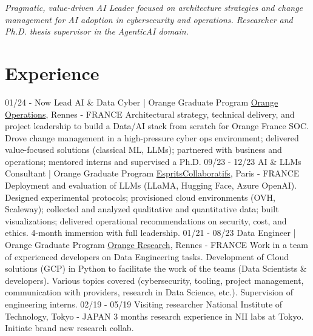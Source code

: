 \documentclass[]{friggeri-cv}
\begin{document}
\emph{Pragmatic, value-driven AI Leader focused on architecture strategies and change management for AI adoption in cybersecurity and operations. Researcher and Ph.D. thesis supervisor in the AgenticAI domain.}
\vspace{-0.5em}
\section{Experience}
\vspace{-0.5em}
\begin{entrylist}
  \entry
  {01/24 - Now}
  {Lead AI \& Data Cyber | Orange Graduate Program}
  {\href{http://www.orange.com/en/home}{Orange Operations}, Rennes - FRANCE}
  {Architectural strategy, technical delivery, and project leadership to build a Data/AI stack from scratch for Orange France SOC. Drove change management in a high-pressure cyber ops environment; delivered value-focused solutions (classical ML, LLMs); partnered with business and operations; mentored interns and supervised a Ph.D.}
  \entry
  {09/23 - 12/23}
  {AI \& LLMs Consultant | Orange Graduate Program}
  {\href{https://www.curebot.fr/}{EspritsCollaboratifs}, Paris - FRANCE}
  {Deployment and evaluation of LLMs (LLaMA, Hugging Face, Azure OpenAI). Designed experimental protocols; provisioned cloud environments (OVH, Scaleway); collected and analyzed qualitative and quantitative data; built visualizations; delivered operational recommendations on security, cost, and ethics. 4-month immersion with full leadership.}
  \entry
  {01/21 - 08/23}
  {Data Engineer | Orange Graduate Program}
  {\href{http://www.orange.com/en/home}{Orange Research}, Rennes - FRANCE}
  {Work in a team of experienced developers on Data Engineering tasks.
    Development of Cloud solutions (GCP) in Python to facilitate the work of the teams (Data Scientists \& developers).
    Various topics covered (cybersecurity, tooling, project management, communication with providers, research in Data Science, etc.).
    Supervision of engineering interns.
  }
  \entry
  {02/19 - 05/19}
  {Visiting researcher}
  {National Institute of Technology, Tokyo - JAPAN}
  {3 months research experience in NII labs at Tokyo.
    Initiate brand new research collab.
}
\end{entrylist}
\end{document}
